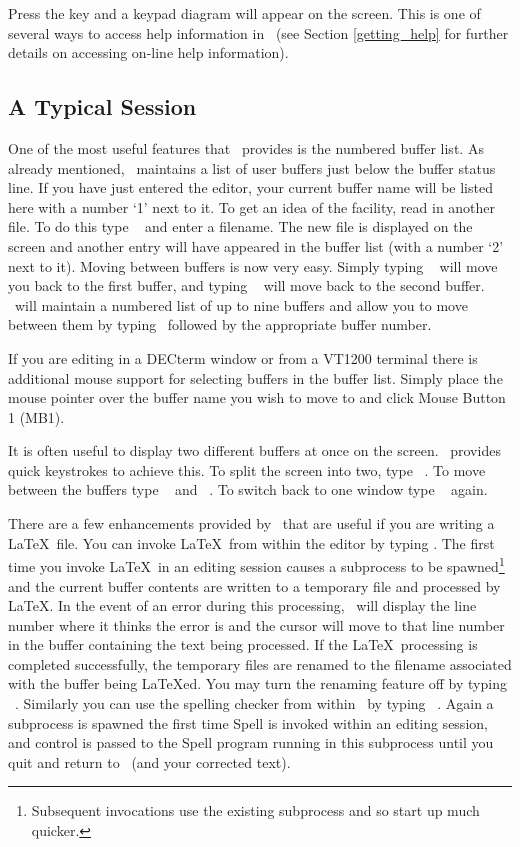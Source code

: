 Press the  key and a keypad diagram will appear on the screen.
This is one of several ways to access help information in \STEve\ (see Section
\ref{getting_help} for further details on accessing on-line help information).

\subsection{A Typical Session}

One of the most useful features that \STEve\ provides is the numbered buffer
list. As already mentioned, \STEve\ maintains a list of user buffers just below 
the buffer status line. If you have just entered the editor, your current
buffer name will be listed here with a number `1' next to it. To get an idea of
the facility, read in another file. To do this type \gold\  and
enter a filename. The new file is displayed on the screen and another entry
will have appeared in the buffer list (with a number `2' next to it). Moving
between buffers is now very easy. Simply typing \gold\  will move
you back to the first buffer, and typing \gold\  will move back to
the second buffer. \STEve\ will maintain a numbered list of up to nine buffers
and allow you to move between them by typing \gold\ followed by the appropriate
buffer number. 

If you are editing in a DECterm window or from a VT1200 terminal there is
additional mouse support for selecting buffers in the buffer list. Simply place
the mouse pointer over the buffer name you wish to move to and click Mouse
Button 1 (MB1).

It is often useful to display two different buffers at once on the screen.
\STEve\ provides quick keystrokes to achieve this. To split the screen into
two, type \gold\ \keyname{=}. To move between the buffers type \gold\
\keyname{$\bigtriangleup$} and \gold\ \keyname{$\bigtriangledown$}. To switch
back to one window type \gold\ \keyname{=} again.

There are a few enhancements provided by \STEve\ that are useful if you are
writing a \LaTeX\ file. You can invoke \LaTeX\ from within the editor by typing 
\keyname{CTRL} \keyname{L}. The first time you invoke \LaTeX\ in an editing
session causes a subprocess to be spawned\footnote{Subsequent invocations use 
the existing subprocess and so start up much quicker.}  
and the current buffer contents are written to a temporary file
and processed by \LaTeX . In the event of an error during this processing,
\STEve\ will display the line number where it thinks the error is and the
cursor will move to that line number in the buffer containing the text being
processed. If the \LaTeX\ processing is completed successfully, the temporary
files are renamed to the filename associated with the buffer being \LaTeX ed.
You may turn the renaming feature off by typing
\gold\ . Similarly you can use the spelling checker from within
\STEve\ by typing \gold\ \keyname{S}. Again a subprocess is spawned the first
time Spell is invoked within an editing session, and control is passed to the
Spell program running in this subprocess until you quit and return to \STEve\
(and your corrected text).

